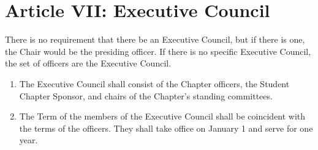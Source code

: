 \section*{Article VII: Executive Council}

There is no requirement that there be an Executive Council, but if there is one, the Chair would be the presiding officer.
If there is no specific Executive Council, the set of officers are the Executive Council.

\begin{enumerate}
    \item The Executive Council shall consist of the Chapter officers, the Student Chapter Sponsor, and chairs of the Chapter's standing committees.
    \item The Term of the members of the Executive Council shall be coincident with the terms of the officers.
    They shall take office on January 1 and serve for one year.
\end{enumerate}
